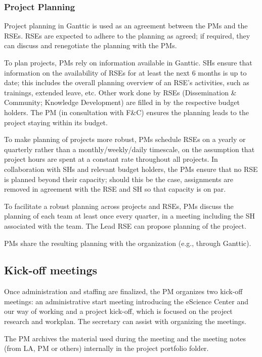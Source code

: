 \documentclass[11pt]{article}
\begin{document}
\subsubsection{Project Planning}

Project planning in Ganttic is used as an agreement between the PMs and the RSEs. RSEs are expected to adhere to the
planning as agreed; if required, they can discuss and renegotiate the planning with the PMs.

To plan projects, PMs rely on information available in Ganttic. SHs ensure that information on the availability of RSEs
for at least the next 6 months is up to date; this includes the overall planning overview of an
RSE's activities, such as trainings, extended leave, etc. Other work done by RSEs (Dissemination
\& Community; Knowledge Development) are filled in by the respective budget holders. The PM (in consultation with F\&C)
ensures the planning leads to the project staying within its budget.

To make planning of projects more robust, PMs schedule RSEs on a yearly or quarterly rather than a monthly/weekly/daily
timescale, on the assumption that project hours are spent at a constant rate throughout all projects. In collaboration
with SHs and relevant budget holders, the PMs ensure that no RSE is planned beyond their capacity; should this be the
case, assignments are removed in agreement with the RSE and SH so that capacity is on par.

To facilitate a robust planning across projects and RSEs, PMs discuss the planning of each team at least once every
quarter, in a meeting including the SH associated with the team. The Lead RSE can propose planning of the project.

PMs share the resulting planning with the organization (e.g., through Ganttic).


\subsection{Kick-off meetings}
Once administration and staffing are finalized, the PM organizes two kick-off meetings: an administrative start meeting
introducing the eScience Center and our way of working and a project kick-off, which is focused on the project research
and workplan. The secretary can assist with organizing the meetings.

The PM archives the material used during the meeting and the meeting notes (from LA, PM or others) internally in the
project portfolio folder.
\end{document}
